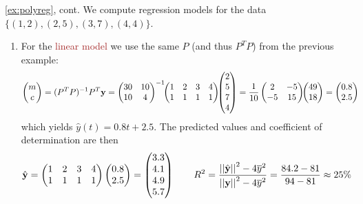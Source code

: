 \begin{example*}{\ref{ex:polyreg}, cont.}
	We compute regression models for the data $\big\{(1,2),(2,5),(3,7),(4,4)\big\}$.
	\begin{enumerate}
	  \item For the \textcolor{Brown}{linear model} we use the same $P$ (and thus $P^TP$) from the previous example:
	  \begin{align*}
	  	\begin{pmatrix}m\\c\end{pmatrix}&=(P^TP)^{-1}P^T{\mathbf{y}}=
	  	\begin{pmatrix}
				30&10\\
				10&4
			\end{pmatrix}^{-1}
			\!\!
			\begin{pmatrix}
				1&2&3&4\\
				1&1&1&1
			\end{pmatrix}
			\!\!\begin{pmatrix}2\\5\\7\\4\end{pmatrix} =\frac 1{10}
			\begin{pmatrix}
				2&-5\\
				-5&15
			\end{pmatrix}
			\!\!\begin{pmatrix}49\\18\end{pmatrix} =\begin{pmatrix}0.8\\2.5\end{pmatrix}
		\end{align*}
		which yields $\hat y(t)=0.8t+2.5$. The predicted values and coefficient of determination are then
		\[
			\hat{{\mathbf{y}}}=
			\begin{pmatrix}
				1&2&3&4\\
				1&1&1&1
			\end{pmatrix}
			\begin{pmatrix}0.8\\2.5\end{pmatrix}=\begin{pmatrix}3.3\\4.1\\4.9\\5.7\end{pmatrix}\qquad 
			R^2 =\frac{\left| \left| \hat{{\mathbf{y}}}\right|\right|^2-4\overline{y}^2}{\left| \left| {\mathbf{y}}\right|\right|^2-4\overline{y}^2} =\frac{84.2-81}{94-81}\approx 25\%
		\]
		

\end{enumerate}
\end{example*}
